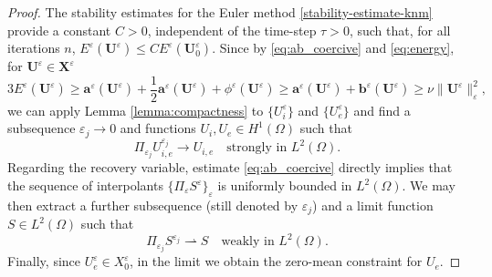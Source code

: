 \documentclass[a4paper,11pt]{article}
\theoremstyle{definition}
\numberwithin{equation}{section}
\newcommand{\e}{\varepsilon}
\begin{document}
\begin{proof} 
	The stability estimates for the Euler method \eqref{stability-estimate-knm} provide a constant $C>0$, independent of the time-step $\tau>0$, such that, for all iterations $n$, $E^\e(\mathbf{U}^{\e}) \le C E^\e(\mathbf{U}_0^{\e})$. Since by \eqref{eq:ab_coercive} and \eqref{eq:energy}, for $\mathbf{U}^{\e} \in \mathbf{X}^\e$
	\[
	3E^\e(\mathbf{U}^{\e}) \geq \mathbf{a}^\e(\mathbf{U}^{\e})+ \dfrac{1}{2} \mathbf{a}^\e(\mathbf{U}^{\e}) 
	+ \phi^\e(\mathbf{U}^{\e}) \geq \mathbf{a}^\e(\mathbf{U}^{\e})+\mathbf{b}^\e(\mathbf{U}^{\e})\geq \nu \|\mathbf{U}^{\e}\|^2_{\e}, 
	\]
	we can apply Lemma \ref{lemma:compactness} to $\{U_{i}^{\e}\}$ and $\{U_{e}^{\e}\}$ and find a subsequence $\e_j \to 0$ and functions $U_{i} ,U_{e} \in H^1(\Omega)$ such that
	\begin{equation*}
		\Pi_{\e_j} U_{i,e}^{\e_j} \to U_{i,e} \quad \text{strongly in } L^2(\Omega).
	\end{equation*}
	Regarding the recovery variable, estimate \eqref{eq:ab_coercive} directly implies that the sequence of interpolants $\{\Pi_\e S^{\e}\}_\e$ is uniformly bounded in $L^2(\Omega)$. We may then extract a further subsequence (still denoted by $\e_j$) and a limit function $S \in L^2(\Omega)$ such that
	\begin{equation*}
		\Pi_{\e_j} S^{\e_j} \rightharpoonup S \quad \text{weakly in } L^2(\Omega).
	\end{equation*}
	Finally, since $U_{e}^{\e} \in X_0^\e$, in the limit we obtain the zero-mean constraint for $U_e$.%
\end{proof}
\end{document}
